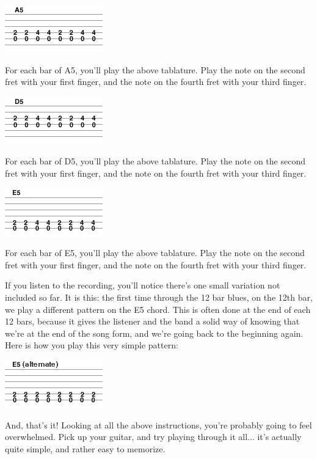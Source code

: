 \includegraphics{partfive/shufflea5tab.png}

For each bar of A5, you'll play the above tablature. Play the note on the second fret with your first finger, and the note on the fourth fret with your third finger. 

\includegraphics{partfive/shuffled5tab.png}

For each bar of D5, you'll play the above tablature. Play the note on the second fret with your first finger, and the note on the fourth fret with your third finger. 

\includegraphics{partfive/shufflee5tab.png}

For each bar of E5, you'll play the above tablature. Play the note on the second fret with your first finger, and the note on the fourth fret with your third finger.

If you listen to the recording, you'll notice there's one small variation not included so far. It is this: the first time through the 12 bar blues, on the 12th bar, we play a different pattern on the E5 chord. This is often done at the end of each 12 bars, because it gives the listener and the band a solid way of knowing that we're at the end of the song form, and we're going back to the beginning again. Here is how you play this very simple pattern: 

\includegraphics{partfive/shufflee5alternate.png}

And, that's it! Looking at all the above instructions, you're probably going to feel overwhelmed. Pick up your guitar, and try playing through it all... it's actually quite simple, and rather easy to memorize. 


